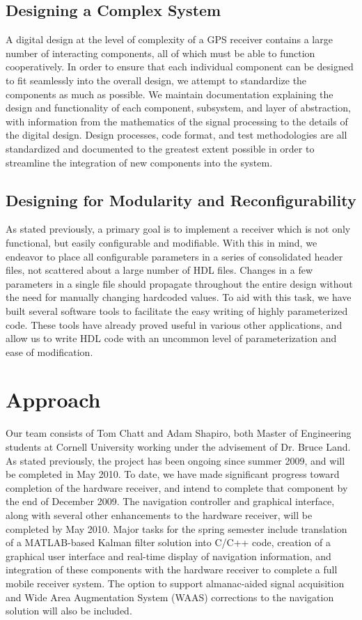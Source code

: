 \documentclass[14pt]{article}
\begin{document}
\subsection*{Designing a Complex System}
A digital design at the level of complexity of a GPS receiver contains a large number of interacting
components, all of which must be able to function cooperatively.  In order to ensure that each
individual component can be designed to fit seamlessly into the overall design, we attempt to standardize the
components as much as possible.  We maintain documentation explaining the design and functionality of
each component, subsystem, and layer of abstraction, with information from the mathematics of the signal
processing to the details of the digital design.  Design processes, code format, and test methodologies
are all standardized and documented to the greatest extent possible in order to streamline the
integration of new components into the system.

\subsection*{Designing for Modularity and Reconfigurability}
As stated previously, a primary goal is to implement a receiver which is not only functional, but easily
configurable and modifiable.  With this in mind, we endeavor to place all configurable parameters in a
series of consolidated header files, not scattered about a large number of HDL files.  Changes in a few
parameters in a single file should propagate throughout the entire design without the need for manually
changing hardcoded values.  To aid with this task, we have built several software tools to facilitate
the easy writing of highly parameterized code.  These tools have already proved useful in various other
applications, and allow us to write HDL code with an uncommon level of parameterization and ease of
modification.

\section*{Approach}
Our team consists of Tom Chatt and Adam Shapiro, both Master of Engineering students at Cornell
University working under the advisement of Dr. Bruce Land.  As stated previously, the project has been 
ongoing since summer 2009, and will be completed in May 2010.  To date, we have made significant progress 
toward completion of the hardware receiver, and intend to complete that component by the end of December 2009.
The navigation controller and graphical interface, along with several other enhancements to the hardware
receiver, will be completed by May 2010.  Major tasks for the spring semester include translation of a
MATLAB-based Kalman filter solution into C/C++ code, creation of a graphical user interface and
real-time display of navigation information, and integration of these components with the hardware
receiver to complete a full mobile receiver system.  The option to support almanac-aided signal
acquisition and Wide Area Augmentation System (WAAS) corrections to the navigation solution will also be
included.
\end{document}
